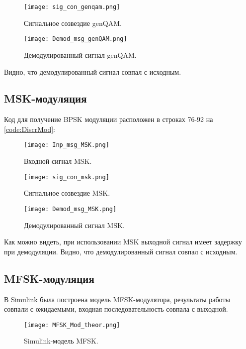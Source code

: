\begin{figure}[H]
	\begin{center}
		\texttt{[image: sig\_con\_genqam.png]}
		\caption{Сигнальное созвездие genQAM.}
		\label{sig_con_genqam}
	\end{center}
\end{figure}

\begin{figure}[H]
	\begin{center}
		\texttt{[image: Demod\_msg\_genQAM.png]}
		\caption{Демодулированный сигнал genQAM.} %
		\label{Demod_msg_genQAM} %
	\end{center}
\end{figure}
Видно, что демодулированный сигнал совпал с исходным.
\subsection{MSK-модуляция}
 Код для получение BPSK модуляции расположен в строках 76-92 на \ref{code:DiscrMod}:
\begin{figure}[H]
	\begin{center}
		\texttt{[image: Inp\_msg\_MSK.png]}
		\caption{Входной сигнал MSK.} %
		\label{Inp_msg_MSK} %
	\end{center}
\end{figure}

\begin{figure}[H]
	\begin{center}
		\texttt{[image: sig\_con\_msk.png]}
		\caption{Сигнальное созвездие MSK.} %
		\label{sig_con_msk} %
	\end{center}
\end{figure}

\begin{figure}[H]
	\begin{center}
		\texttt{[image: Demod\_msg\_MSK.png]}
		\caption{Демодулированный сигнал MSK.} %
		\label{Demod_msg_MSK} %
	\end{center}
\end{figure}
Как можно видеть, при использовании MSK выходной сигнал имеет задержку при демодуляции.
Видно, что демодулированный сигнал совпал с исходным.
\subsection{MFSK-модуляция}
В Simulink была построена модель MFSK-модулятора, результаты работы совпали с ожидаемыми, входная последовательность совпала с выходной.
\begin{figure}[H]
	\begin{center}
		\texttt{[image: MFSK\_Mod\_theor.png]}
		\caption{Simulink-модель MFSK.} %
		\label{MFSK_Mod_theor} %
	\end{center}
\end{figure}

